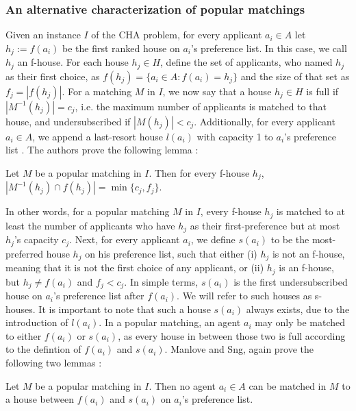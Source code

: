 \subsubsection{An alternative characterization of popular matchings}
Given an instance $I$ of the CHA problem, for every applicant $a_i \in A$ let $h_j := f(a_i)$ be the first ranked house on $a_i$'s preference list. In this case, we call $h_j$ an f-house. For each house $h_j \in H$, define the set of applicants, who named $h_j$ as their first choice, as $f(h_j) = \{a_i \in A: f(a_i) = h_j\}$ and the size of that set as $f_j = |f(h_j)|$. For a matching $M$ in $I$, we now say that a house $h_j \in H$ is full if $|M^{-1}(h_j)| = c_j$, i.e. the maximum number of applicants is matched to that house, and undersubscribed if $|M(h_j)| < c_j$. Additionally, for every applicant $a_i \in A$, we append a last-resort house $l(a_i)$ with capacity 1 to $a_i$'s preference list \cite{ManlovePopularMatchings}. The authors prove the following lemma \cite{ManlovePopularMatchings}:
\newtheorem{lemma-popular-1}[theorem]{Lemma}
\begin{lemma}\label{lemma-popular1}
    Let $M$ be a popular matching in $I$. Then for every f-house $h_j$, $|M^{-1}(h_j) \cap f(h_j)| = \min\{c_j, f_j\}$.
\end{lemma} 
In other words, for a popular matching $M$ in $I$, every f-house $h_j$ is matched to at least the number of applicants who have $h_j$ as their first-preference but at most $h_j$'s capacity $c_j$. Next, for every applicant $a_i$, we define $s(a_i)$ to be the most-preferred house $h_j$ on his preference list, such that either (i) $h_j$  is not an f-house, meaning that it is not the first choice of any applicant, or (ii) $h_j$ is an f-house, but $h_j \neq f(a_i)$ and $f_j < c_j$. In simple terms, $s(a_i)$ is the first undersubscribed house on $a_i$'s preference list after $f(a_i)$. We will refer to such houses as s-houses. It is important to note that such a house $s(a_i)$ always exists, due to the introduction of $l(a_i)$. In a popular matching, an agent $a_i$ may only be matched to either $f(a_i)$ or $s(a_i)$, as every house in between those two is full according to the defintion of $f(a_i)$ and $s(a_i)$. Manlove and Sng, again prove the following two lemmas \cite{ManlovePopularMatchings}: 

\newtheorem{lemma-popular-2}[theorem]{Lemma}
\begin{lemma}\label{lemma-popular2}
    Let $M$ be a popular matching in $I$. Then no agent $a_i \in A$ can be matched in $M$ to a house between $f(a_i)$ and $s(a_i)$ on $a_i$'s preference list.
\end{lemma} 

